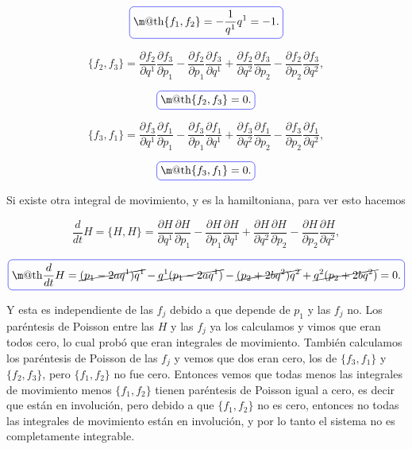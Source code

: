 \documentclass[a4paper,10pt]{article}
\makeatletter
\numberwithin{equation}{section}
\newcommand*{\boxcolor}{blue}
\renewcommand{\boxed}[1]{\textcolor{\boxcolor}{%
\tikz[baseline={([yshift=-1ex]current bounding box.center)}] \node [rectangle, minimum width=1ex,rounded corners,draw] {\normalcolor\m@th$\displaystyle#1$};}}
\makeatother
\begin{document}
\begin{equation}
 \boxed{ \{f_1,f_2\} = - \frac{1}{q^1}q^1 = -1. }
\end{equation}

\begin{equation}
 \{f_2,f_3\} = \frac{\partial f_2}{\partial q^1}\frac{\partial f_3}{\partial p_1} - 
 \frac{\partial f_2}{\partial p_1}\frac{\partial f_3}{\partial q^1} +  \frac{\partial f_2}{\partial q^2}\frac{\partial f_3}{\partial p_2} - 
 \frac{\partial f_2}{\partial p_2}\frac{\partial f_3}{\partial q^2},
\end{equation}

\begin{equation}
 \boxed{ \{f_2,f_3\} = 0 .}
\end{equation}

\begin{equation}
 \{f_3,f_1\} = \frac{\partial f_3}{\partial q^1}\frac{\partial f_1}{\partial p_1} - 
 \frac{\partial f_3}{\partial p_1}\frac{\partial f_1}{\partial q^1} +  \frac{\partial f_3}{\partial q^2}\frac{\partial f_1}{\partial p_2} - 
 \frac{\partial f_3}{\partial p_2}\frac{\partial f_1}{\partial q^2},
\end{equation}

\begin{equation}
 \boxed{ \{f_3,f_1\} = 0 .}
\end{equation}


Si existe otra integral de movimiento, y es la hamiltoniana, para ver esto hacemos 

\begin{equation}
 \frac{d}{dt} H = \{H,H\} = \frac{\partial H}{\partial q^1}\frac{\partial H}{\partial p_1} - 
 \frac{\partial H}{\partial p_1}\frac{\partial H}{\partial q^1} +  \frac{\partial H}{\partial q^2}\frac{\partial H}{\partial p_2} - 
 \frac{\partial H}{\partial p_2}\frac{\partial H}{\partial q^2},
\end{equation}

\begin{equation}
  \boxed{\frac{d}{dt} H = \cancel{(p_1 - 2aq^1)q^1} - \cancel{q^1(p_1 - 2aq^1)} - \cancel{(p_2 + 2bq^2)q^2} + 
  \cancel{q^2(p_2 + 2bq^2)} = 0.}
\end{equation}

Y esta es independiente de las $f_j$ debido a que depende de $p_1$ y las $f_j$ no. Los 
paréntesis de Poisson entre las $H$ y las $f_j$ ya los calculamos y vimos que eran todos 
cero, lo cual probó que eran integrales de movimiento. También calculamos los paréntesis de 
Poisson de las $f_j$ y vemos que dos eran cero, los de $\{f_3,f_1\}$ y $\{f_2,f_3\}$, pero 
$\{f_1,f_2\}$ no fue cero. Entonces vemos que todas menos las integrales de movimiento 
menos $\{f_1,f_2\}$ tienen paréntesis de Poisson igual a cero, es decir que están en involución,
pero debido a que $\{f_1,f_2\}$ no es cero, entonces no todas las integrales de movimiento 
están en involución, y por lo tanto el sistema no es completamente integrable.
\end{document}

